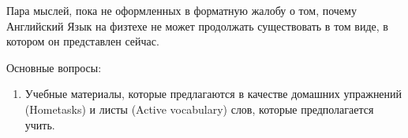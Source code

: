 Пара мыслей, пока не оформленных в форматную жалобу о том, почему Английский Язык на физтехе не может продолжать существовать в том виде, в котором он представлен сейчас. 

Основные вопросы:

\begin{enumerate}
	\item Учебные материалы, которые предлагаются в качестве домашних упражнений (Hometasks) и листы (Active vocabulary) слов, которые предполагается учить. 
	
\end{enumerate}